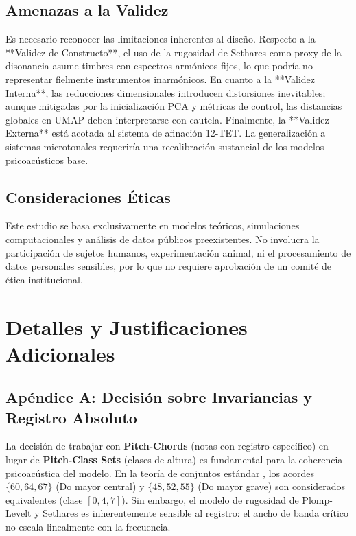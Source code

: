 \subsection{Amenazas a la Validez}
Es necesario reconocer las limitaciones inherentes al diseño. Respecto a la **Validez de Constructo**, el uso de la rugosidad de Sethares como proxy de la disonancia asume timbres con espectros armónicos fijos, lo que podría no representar fielmente instrumentos inarmónicos. En cuanto a la **Validez Interna**, las reducciones dimensionales introducen distorsiones inevitables; aunque mitigadas por la inicialización PCA y métricas de control, las distancias globales en UMAP deben interpretarse con cautela. Finalmente, la **Validez Externa** está acotada al sistema de afinación 12-TET. La generalización a sistemas microtonales requeriría una recalibración sustancial de los modelos psicoacústicos base.

\subsection{Consideraciones Éticas}
Este estudio se basa exclusivamente en modelos teóricos, simulaciones computacionales y análisis de datos públicos preexistentes. No involucra la participación de sujetos humanos, experimentación animal, ni el procesamiento de datos personales sensibles, por lo que no requiere aprobación de un comité de ética institucional.

\appendix

\section{Detalles y Justificaciones Adicionales}

\subsection{Apéndice A: Decisión sobre Invariancias y Registro Absoluto}
\label{app:invariancia}

La decisión de trabajar con \textbf{Pitch-Chords} (notas con registro específico) en lugar de \textbf{Pitch-Class Sets} (clases de altura) es fundamental para la coherencia psicoacústica del modelo. En la teoría de conjuntos estándar \cite{AllenForteSTRUCTURE}, los acordes $\{60, 64, 67\}$ (Do mayor central) y $\{48, 52, 55\}$ (Do mayor grave) son considerados equivalentes (clase $[0,4,7]$). Sin embargo, el modelo de rugosidad de Plomp-Levelt y Sethares es inherentemente sensible al registro: el ancho de banda crítico no escala linealmente con la frecuencia.

